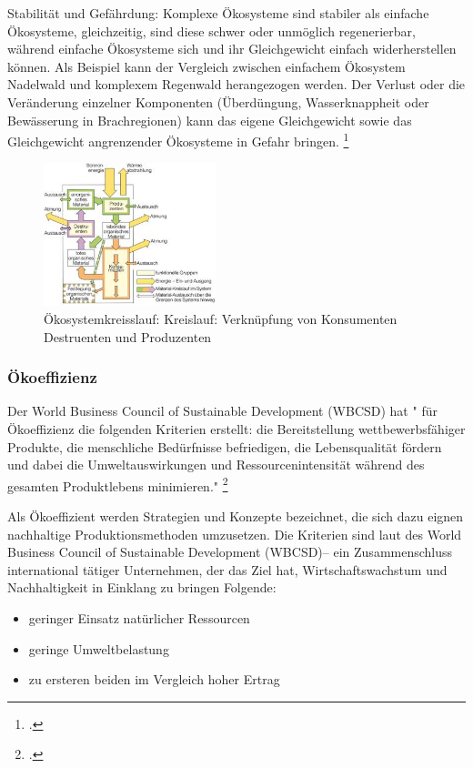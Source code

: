 \documentclass{article}
\begin{document}
Stabilität und Gefährdung: Komplexe Ökosysteme sind stabiler als einfache Ökosysteme, gleichzeitig, sind diese schwer oder unmöglich regenerierbar, während einfache Ökosysteme sich und ihr Gleichgewicht einfach widerherstellen können. Als Beispiel kann der Vergleich zwischen einfachem Ökosystem Nadelwald und komplexem Regenwald herangezogen werden.
Der Verlust oder die Veränderung einzelner Komponenten (Überdüngung, Wasserknappheit oder Bewässerung in Brachregionen) kann das eigene Gleichgewicht sowie das Gleichgewicht angrenzender Ökosysteme in Gefahr bringen. \footcite{DefinitionWirtschaftslexikone}

\begin{figure}[htp]
\centering
\includegraphics[width=5cm]{image_folder/oekosystemkreisslauf.png}
\caption{Ökosystemkreisslauf: Kreislauf: Verknüpfung von Konsumenten Destruenten und Produzenten}
\label{fig:Ökosystemkreisslauf}
\end{figure}
        
\subsubsection{Ökoeffizienz}
 Der World Business Council of Sustainable Development (WBCSD) hat " für Ökoeffizienz die folgenden Kriterien erstellt: die Bereitstellung wettbewerbsfähiger Produkte, die menschliche Bedürfnisse befriedigen, die Lebensqualität fördern und dabei die Umweltauswirkungen und Ressourcenintensität während des gesamten Produktlebens minimieren." \footcite{OkoeffizienzBrockhaus.de}

Als Ökoeffizient werden Strategien und Konzepte bezeichnet, die sich dazu eignen nachhaltige Produktionsmethoden umzusetzen. Die Kriterien sind laut des World Business Council of Sustainable Development (WBCSD)– ein Zusammenschluss international tätiger Unternehmen, der das Ziel hat, Wirtschaftswachstum und Nachhaltigkeit in Einklang zu bringen Folgende:
\begin{itemize}
\item geringer Einsatz natürlicher Ressourcen
\item geringe Umweltbelastung
\item zu ersteren beiden im Vergleich hoher Ertrag
\end{itemize}
\end{document}
